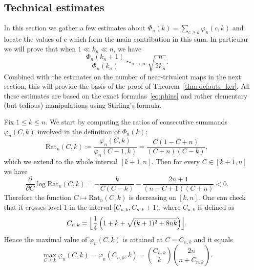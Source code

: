 \documentclass[JEP,XML,SOM,Unicode,NoFloatCountersInSection,NoEqCountersInSection]{cedram}
\theoremstyle{plain}
\theoremstyle{definition}
\theoremstyle{remark}
\newcommand{\equi}[1][n]{\,\mathop{\sim}^{}_{#1 \to \infty}\,}
\begin{document}
\subsection{Technical estimates}

In this section we gather a few estimates about $\Phi_n(k) = \sum_{c \geq k} \varphi_{n}(c,k)$ and locate the values of $c$ which form the main contribution in this sum. In particular we will prove that when $1 \ll k_{n} \ll n$, we have
\begin{equation}\label{eq:ratioPhi1}
\frac{ \Phi_{n}(k_{n}+1)}{ \Phi_{n}(k_{n})} \equi \sqrt{ \frac{n}{2 k_{n}}}.
\end{equation}
Combined with the estimates on the number of near-trivalent maps in the next section, this will provide the basis of the proof of Theorem~\ref{thm:defauts_ker}. All these estimates are based on the exact formulas~\eqref{eq:phins} and rather elementary (but tedious) manipulations using Stirling's formula.

Fix $1 \leq k \leq n$. We start by computing the ratios of consecutive summands $\varphi_n(C,k)$ involved in the definition of $\Phi_n(k)$:
\begin{equation}\label{eq:def_Rat}
\mathrm{Rat}_{n}(C,k) \coloneqq \frac{\varphi_n(C,k)}{\varphi_n(C-1,k)} = \frac{C (1 - C + n)}{(C + n) (C - k)},
\end{equation}which we extend to the whole interval $[k+1,n]$.
Then for every $C \in [k+1,n]$ we have
\begin{equation}\label{eq:derivlog}
\frac{\partial}{\partial C} \log \mathrm{Rat}_n(C,k)
= - \frac{k}{C(C-k)}- \frac{2n+1}{(n-C+1)(C+n)}
< 0.
\end{equation}
Therefore the function $C \mapsto \mathrm{Rat}_n(C,k)$ is decreasing on $[k,n]$. One can check that it crosses level $1$ in the interval $[C_{n,k},C_{n,k}+1)$, where $C_{n,k}$ is defined as
\begin{equation}\label{eq:argmax_phi}
C_{n,k} = \Bigl\lfloor \frac{1}{4} \left(1+k + \sqrt{ (k+1)^{2} + 8 n k } \right) \Bigr\rfloor.
\end{equation}
Hence the maximal value of $\varphi_n(C,k)$ is attained at $C=C_{n,k}$ and it equals
\[
\max_{C \ge k} \varphi_n(C,k) = \varphi_n(C_{n,k},k) = \binom{C_{n,k}}{k} \binom{2n}{n+C_{n,k}}.
\]
\end{document}
